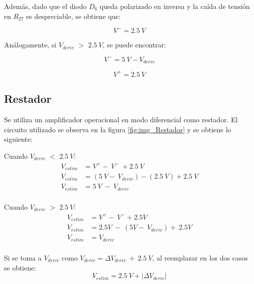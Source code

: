 Además, dado que el diodo $D_6$ queda polarizado en inversa y la caída de tensión en $R_{27}$ es despreciable, se obtiene que:
 
 \begin{equation} 
 	V^- = 2.5\:V 
 \end{equation}

Análogamente, si $V_{deriv}$ $\mathrm{>}$ $2.5\:V$, se puede encontrar:

\begin{equation} \label{eq_V+_3}
	V^- =5\:V-V_{deriv} 
\end{equation}

\begin{equation} 
	V^+ = 2.5\:V
\end{equation}


\subsection{Restador}

Se utiliza un amplificador operacional en modo diferencial como restador. El circuito utilizado se observa en la figura \ref{fig:img_Restador} y se obtiene lo siguiente:

Cuando $V_{deriv}$ $\mathrm{<}$ $2.5\:V$:
\begin{equation*} 
	\begin{aligned}
		V_{estim}&=V^+-\ V^-\ +2.5\:V\\ 
		V_{estim}&=(5\:V -\ V_{deriv})-(2.5\: V)+2.5\:V\\
		V_{estim}&=5\: V\ -\ V_{deriv}\\ 
	\end{aligned}
\end{equation*}


Cuando $V_{deriv}$ $\mathrm{>}$ $2.5\:V$: 
\begin{equation*} 
	\begin{aligned}
		V_{estim}&=V^+-\ V^-+2.5V\\ 
		V_{estim}&=2.5V\ -\ (5V-\ V_{deriv})+\ 2.5V\\
		V_{estim}&=V_{deriv}\\
	\end{aligned}
\end{equation*}

Si se toma a $V_{deriv}$ como $V_{deriv}=\mathit{\Delta}V_{deriv}\ +\ 2.5\: V$, al reemplazar en los dos casos se obtiene:
\begin{equation} \label{eq_rest_3}
	V_{estim}= 2.5\:V + |\mathit{\Delta}V_{deriv}|
\end{equation}

